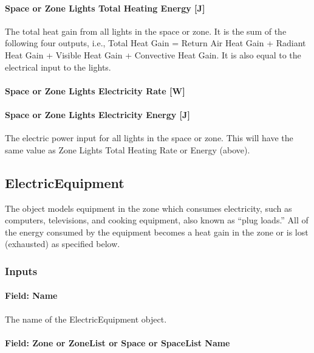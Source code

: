 \paragraph{Space or Zone Lights Total Heating Energy {[}J{]}}\label{zone-lights-total-heating-energy-j}

The total heat gain from all lights in the space or zone. It is the sum of the following four outputs, i.e., Total Heat Gain = Return Air Heat Gain + Radiant Heat Gain + Visible Heat Gain + Convective Heat Gain. It is also equal to the electrical input to the lights.

\paragraph{Space or Zone Lights Electricity Rate {[}W{]}}\label{zone-lights-electric-power-w}

\paragraph{Space or Zone Lights Electricity Energy {[}J{]}}\label{zone-lights-electric-energy-j}

The electric power input for all lights in the space or zone. This will have the same value as Zone Lights Total Heating Rate or Energy (above).

\subsection{ElectricEquipment}\label{electricequipment}

The object models equipment in the zone which consumes electricity, such as computers, televisions, and cooking equipment, also known as ``plug loads.'' All of the energy consumed by the equipment becomes a heat gain in the zone or is lost (exhausted) as specified below.

\subsubsection{Inputs}\label{inputs-3-019}

\paragraph{Field: Name}\label{field-name-3-017}

The name of the ElectricEquipment object.

\paragraph{Field: Zone or ZoneList or Space or SpaceList Name}\label{eleceq-field-zone-or-zonelist-name-000}

